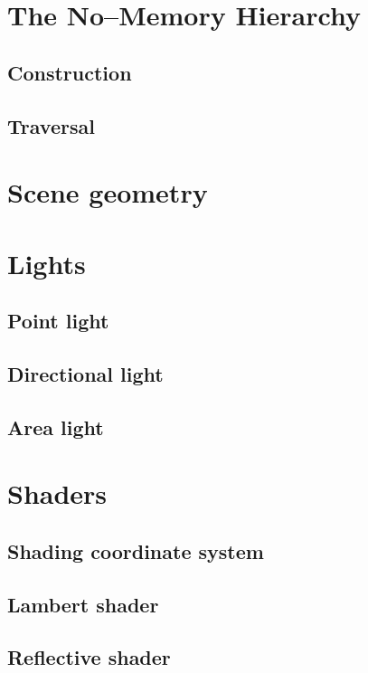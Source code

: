 \section{The No--Memory Hierarchy}

\subsection{Construction}

\subsection{Traversal}

\section{Scene geometry}

\section{Lights}

\subsection{Point light}

\subsection{Directional light}

\subsection{Area light}

\section{Shaders}

\subsection{Shading coordinate system}

\subsection{Lambert shader}

\subsection{Reflective shader}

